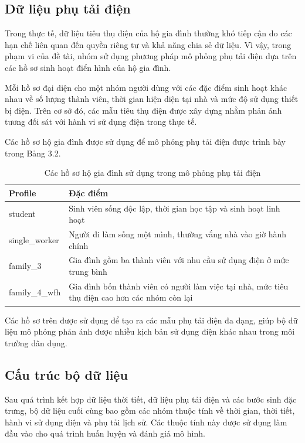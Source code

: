 \subsection{Dữ liệu phụ tải điện}

Trong thực tế, dữ liệu tiêu thụ điện của hộ gia đình thường khó tiếp cận do các hạn chế liên quan đến quyền riêng tư và khả năng chia sẻ dữ liệu. Vì vậy, trong phạm vi của đề tài, nhóm sử dụng phương pháp mô phỏng phụ tải điện dựa trên các hồ sơ sinh hoạt điển hình của hộ gia đình.

Mỗi hồ sơ đại diện cho một nhóm người dùng với các đặc điểm sinh hoạt khác nhau về số lượng thành viên, thời gian hiện diện tại nhà và mức độ sử dụng thiết bị điện. Trên cơ sở đó, các mẫu tiêu thụ điện được xây dựng nhằm phản ánh tương đối sát với hành vi sử dụng điện trong thực tế.

Các hồ sơ hộ gia đình được sử dụng để mô phỏng phụ tải điện được trình bày trong Bảng 3.2.

\begin{table}[H]
\centering
\caption{Các hồ sơ hộ gia đình sử dụng trong mô phỏng phụ tải điện}
\begin{tabular}{|p{4cm}|p{9.5cm}|}
\hline
\textbf{Profile} & \textbf{Đặc điểm} \\
\hline
student & Sinh viên sống độc lập, thời gian học tập và sinh hoạt linh hoạt \\
\hline
single\_worker & Người đi làm sống một mình, thường vắng nhà vào giờ hành chính \\
\hline
family\_3 & Gia đình gồm ba thành viên với nhu cầu sử dụng điện ở mức trung bình \\
\hline
family\_4\_wfh & Gia đình bốn thành viên có người làm việc tại nhà, mức tiêu thụ điện cao hơn các nhóm còn lại \\
\hline
\end{tabular}
\end{table}

Các hồ sơ trên được sử dụng để tạo ra các mẫu phụ tải điện đa dạng, giúp bộ dữ liệu mô phỏng phản ánh được nhiều kịch bản sử dụng điện khác nhau trong môi trường dân dụng.

\subsection{Cấu trúc bộ dữ liệu}

Sau quá trình kết hợp dữ liệu thời tiết, dữ liệu phụ tải điện và các bước sinh đặc trưng, bộ dữ liệu cuối cùng bao gồm các nhóm thuộc tính về thời gian, thời tiết, hành vi sử dụng điện và phụ tải lịch sử. Các thuộc tính này được sử dụng làm đầu vào cho quá trình huấn luyện và đánh giá mô hình.

